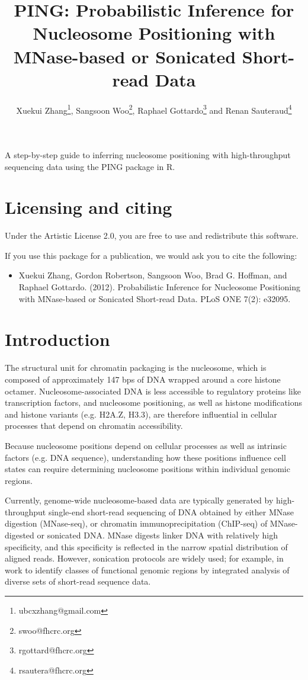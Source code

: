\documentclass[11pt]{article}
\title{PING: Probabilistic Inference for Nucleosome Positioning with MNase-based or Sonicated Short-read Data}
\author{Xuekui Zhang\footnote{ubcxzhang@gmail.com}, Sangsoon Woo\footnote{swoo@fhcrc.org}, Raphael Gottardo\footnote{rgottard@fhcrc.org} and Renan Sauteraud\footnote{rsautera@fhcrc.org}}
\begin{document}
\maketitle



\textnormal {\normalfont}
A step-by-step guide to inferring nucleosome positioning with high-throughput sequencing data using the PING package in R.

\tableofcontents
\newpage


\section{Licensing and citing}

Under the Artistic License 2.0, you are free to use and redistribute this software. 

If you use this package for a publication, we would ask you to cite the following: 

\begin{itemize}
\item[] Xuekui Zhang, Gordon Robertson, Sangsoon Woo, Brad G. Hoffman, and Raphael Gottardo. (2012). Probabilistic Inference for Nucleosome Positioning with MNase-based or Sonicated Short-read Data. PLoS ONE 7(2): e32095.
\end{itemize}


\section{Introduction}
The structural unit for chromatin packaging is the nucleosome, which is composed of approximately 147 bps of DNA wrapped around a core histone octamer.  Nucleosome-associated DNA is less accessible to regulatory proteins like transcription factors, and nucleosome positioning, as well as histone modifications and histone variants (e.g. H2A.Z, H3.3), are therefore influential in cellular processes that depend on chromatin accessibility. 

Because nucleosome positions depend on cellular processes as well as intrinsic
factors (e.g. DNA sequence), understanding how these positions influence cell states can require determining nucleosome positions within individual genomic regions.

Currently, genome-wide nucleosome-based data are typically generated by high-throughput single-end short-read sequencing of DNA obtained by either MNase digestion (MNase-seq), or chromatin immunoprecipitation (ChIP-seq) of MNase-digested or sonicated DNA. MNase digests linker DNA with relatively high specificity, and this specificity is reflected in the narrow spatial distribution of aligned reads. However, sonication protocols are widely used;  for example, in work to identify classes of functional genomic regions by integrated analysis of diverse sets of short-read sequence data.
\end{document}
